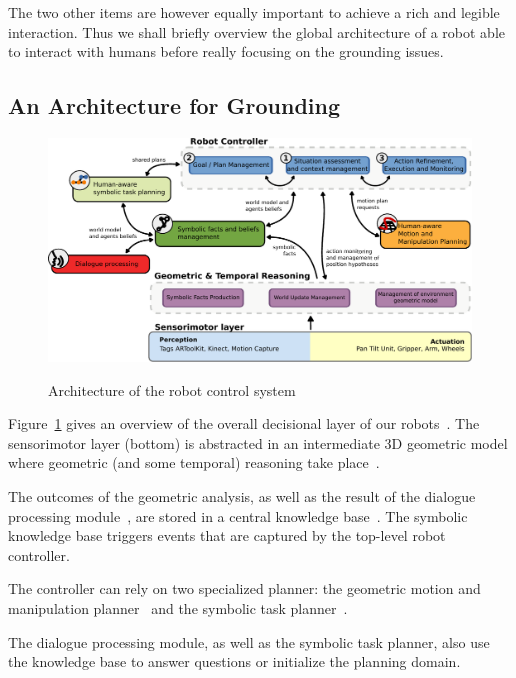 \documentclass{svmult}
\begin{document}
The two other items are however equally important to achieve a rich and legible
interaction. Thus we shall briefly overview the global architecture of a robot
able to interact with humans before really focusing on the grounding issues.


\subsection{An Architecture for Grounding}
 
\begin{figure}[thpb]
  \centering
  \includegraphics[width=1.0\textwidth]{./figs/architecture-overview.pdf} \\
  \caption {Architecture of the robot control system}
  \label{fig|archi}
\end{figure}

Figure~\ref{fig|archi} gives an overview of the overall decisional layer of
our robots~\cite{Alami2011}. The sensorimotor layer (bottom) is abstracted in
an intermediate 3D geometric model where geometric (and some temporal)
reasoning take place~\cite{Sisbot2011}.

The outcomes of the geometric analysis, as well as the result of the dialogue
processing module~\cite{Lemaignan2011b}, are stored in a central knowledge
base~\cite{Lemaignan2010}. The symbolic knowledge base triggers events that are
captured by the top-level robot controller.

The controller can rely on two specialized planner: the geometric motion and
manipulation planner~\cite{Sisbot2008, Mainprice2011, Pandey2010} and the
symbolic task planner~\cite{Alili2008}.

The dialogue processing module, as well as the symbolic task planner, also
use the knowledge base to answer questions or initialize the planning domain.
\end{document}
